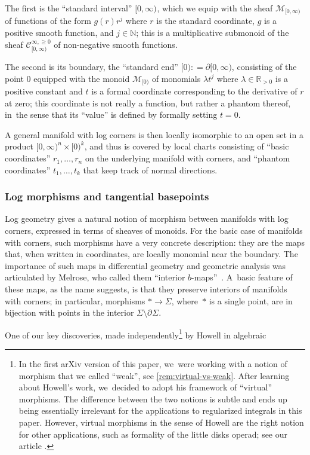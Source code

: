 \documentclass[JEP,XML,SOM,Unicode,NoFloatCountersInSection,published]{cedram}
\theoremstyle{definition}
\theoremstyle{remark}
\newcommand{\RR}{\mathbb{R}}
\newcommand{\NN}{\mathbb{N}}
\newcommand{\model}[2]{\halfspc{#1}\times[0)^{#2}}
\newcommand{\halfspc}[1]{[0,\infty)^{#1}}
\renewcommand{\ge}{\geqslant}
\newcommand{\defas}{\mathrel{\mathop:}=}
\newcommand{\cM}{\mathscr{M}}
\newcommand{\Cinfge}[1]{\mathscr{C}^{\infty, \ge 0}_{#1}}
\newcommand{\Sig}{\Sigma}
\newcommand{\bdSig}[1][]{\partial^{#1}\Sigma}
\begin{document}
The first is the ``standard interval'' $\halfspc{}$, which we equip with the sheaf $\cM_{\halfspc{}}$ of functions of the form $g(r)r^j$ where $r$ is the standard coordinate, $g$ is a positive smooth function, and $j \in \NN$; this is a multiplicative submonoid of the sheaf $\Cinfge{\halfspc{}}$ of non-negative smooth functions.

The second is its boundary, the ``standard end'' $[0) \defas \partial [0,\infty)$, consisting of the point $0$ equipped with the monoid $\cM_{[0)}$ of monomials $\lambda t^j$ where $\lambda \in \RR_{>0}$ is a positive constant and $t$ is a formal coordinate corresponding to the derivative of $r$ at zero; this coordinate is not really a function, but rather a phantom thereof, in~the sense that its ``value'' is defined by formally setting $t=0$.

A general manifold with log corners is then locally isomorphic to an open set in a product $\model{n}{k}$, and thus is covered by local charts consisting of ``basic coordinates'' $r_1,\ldots,r_n$ on the underlying manifold with corners, and ``phantom coordinates'' $t_1,\ldots,t_k$ that keep track of normal directions.

\subsubsection{Log morphisms and tangential basepoints}
Log geometry gives a natural notion of morphism between manifolds with log corners, expressed in terms of sheaves of monoids. For the basic case of manifolds with corners, such morphisms have a very concrete description: they are the maps that, when written in coordinates, are locally monomial near the boundary. The importance of such maps in differential geometry and geometric analysis was articulated by Melrose, who called them ``interior $b$-maps''~\cite{Melrose1992}. A~basic feature of these maps, as the name suggests, is that they preserve interiors of manifolds with corners; in particular, morphisms $* \to \Sig$, where~$*$ is a single point, are in bijection with points in the interior $\Sig\setminus\bdSig$.

One of our key discoveries, made independently\footnote{In the first arXiv version of this paper, we~were working with a notion of morphism that we called ``weak'', see \autoref{rem:virtual-vs-weak}. After learning about Howell's work, we~decided to adopt his framework of ``virtual'' morphisms. The difference between the two notions is subtle and ends up being essentially irrelevant for the applications to regularized integrals in this paper. However, virtual morphisms in the sense of Howell are the right notion for other applications, such as formality of the little disks operad; see our article \cite{DPP:WeakMorphisms}.} by Howell \cite{Howell2017} in algebraic
\end{document}
